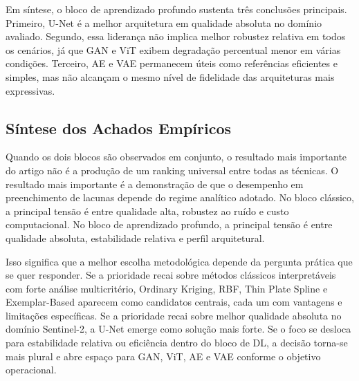 Em síntese, o bloco de aprendizado profundo sustenta três conclusões principais.
Primeiro, U-Net é a melhor arquitetura em qualidade absoluta no domínio avaliado.
Segundo, essa liderança não implica melhor robustez relativa em todos os cenários, já que \gls{GAN} e \gls{ViT} exibem degradação percentual menor em várias condições.
Terceiro, \gls{AE} e \gls{VAE} permanecem úteis como referências eficientes e simples, mas não alcançam o mesmo nível de fidelidade das arquiteturas mais expressivas.

\FloatBarrier

\subsection{Síntese dos Achados Empíricos}

Quando os dois blocos são observados em conjunto, o resultado mais importante do artigo não é a produção de um ranking universal entre todas as técnicas.
O resultado mais importante é a demonstração de que o desempenho em preenchimento de lacunas depende do regime analítico adotado.
No bloco clássico, a principal tensão é entre qualidade alta, robustez ao ruído e custo computacional.
No bloco de aprendizado profundo, a principal tensão é entre qualidade absoluta, estabilidade relativa e perfil arquitetural.

Isso significa que a melhor escolha metodológica depende da pergunta prática que se quer responder.
Se a prioridade recai sobre métodos clássicos interpretáveis com forte análise multicritério, Ordinary Kriging, \gls{RBF}, Thin Plate Spline e Exemplar-Based aparecem como candidatos centrais, cada um com vantagens e limitações específicas.
Se a prioridade recai sobre melhor qualidade absoluta no domínio Sentinel-2, a U-Net emerge como solução mais forte.
Se o foco se desloca para estabilidade relativa ou eficiência dentro do bloco de \gls{DL}, a decisão torna-se mais plural e abre espaço para \gls{GAN}, \gls{ViT}, \gls{AE} e \gls{VAE} conforme o objetivo operacional.
